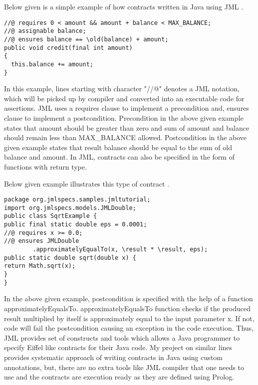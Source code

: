 \begin{minipage}{\linewidth}
Below given is a simple example of how contracts written in Java using JML \cite{JavaMode99:online}.

\lstset{language=Java, caption=JML Contract Example, captionpos=b, breaklines=true}       
\begin{lstlisting}[frame=single]
//@ requires 0 < amount && amount + balance < MAX_BALANCE;
//@ assignable balance;
//@ ensures balance == \old(balance) + amount;
public void credit(final int amount)
{
  this.balance += amount;
}
\end{lstlisting}
\end{minipage}

In this example, lines starting with character "//@" denotes a JML notation, which will be picked up by compiler and converted into an executable code for assertions.
JML uses a requires clause to implement a precondition and, ensures clause to implement a postcondition.
Precondition in the above given example states that amount should be greater than zero and sum of amount and balance should remain less than MAX\_BALANCE allowed.
Postcondition in the above given example states that result balance should be equal to the sum of old balance and amount.
In JML, contracts can also be specified in the form of functions with return type. 
\begin{minipage}{\linewidth}
Below given example illustrates this type of contract \cite{leavens2006design}.

\lstset{language=Java, caption=JML Contract Example with JML function, captionpos=b, breaklines=true}       
\begin{lstlisting}[frame=single]
package org.jmlspecs.samples.jmltutorial;
import org.jmlspecs.models.JMLDouble;
public class SqrtExample {
public final static double eps = 0.0001;
//@ requires x >= 0.0;
//@ ensures JMLDouble
		.approximatelyEqualTo(x, \result * \result, eps);
public static double sqrt(double x) {
return Math.sqrt(x);
}
}
\end{lstlisting}
\end{minipage}


In the above given example, postcondition is specified with the help of a function approximatelyEqualsTo. approximatelyEqualsTo function checks if the produced result multiplied by itself is approximately equal to the input parameter x. If not, code will fail the postcondition causing an exception in the code execution. \linebreak
Thus, JML provides set of constructs and tools which allows a Java programmer to specify Eiffel like contracts for their Java code. My project on similar lines provides systematic approach of writing contracts in Java using custom annotations, but, there are no extra tools like JML compiler that one needs to use and the contracts are execution ready as they are defined using Prolog.

